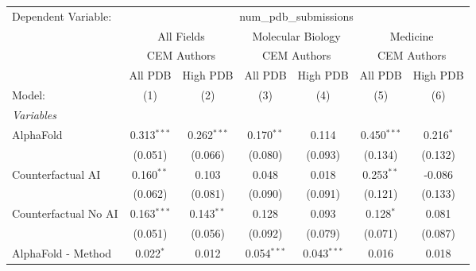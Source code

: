 \begingroup
\centering
\begin{tabular}{lcccccc}
   \tabularnewline \midrule \midrule
   Dependent Variable: & \multicolumn{6}{c}{num\_pdb\_submissions}\\
 & \multicolumn{2}{c}{All Fields} & \multicolumn{2}{c}{Molecular Biology} & \multicolumn{2}{c}{Medicine} \\
\cmidrule(lr){2-3} \cmidrule(lr){4-5} \cmidrule(lr){6-7}
 & \multicolumn{2}{c}{CEM Authors} & \multicolumn{2}{c}{CEM Authors} & \multicolumn{2}{c}{CEM Authors} \\
\cmidrule(lr){2-3} \cmidrule(lr){4-5} \cmidrule(lr){6-7}
 & \multicolumn{1}{c}{All PDB} & \multicolumn{1}{c}{High PDB} & \multicolumn{1}{c}{All PDB} & \multicolumn{1}{c}{High PDB} & \multicolumn{1}{c}{All PDB} & \multicolumn{1}{c}{High PDB} \\
\cmidrule(lr){2-2} \cmidrule(lr){3-3} \cmidrule(lr){4-4} \cmidrule(lr){5-5} \cmidrule(lr){6-6} \cmidrule(lr){7-7}
   Model:                                                     & (1)           & (2)           & (3)           & (4)            & (5)           & (6)\\  
   \midrule
   \emph{Variables}\\
   AlphaFold                                                  & 0.313$^{***}$ & 0.262$^{***}$ & 0.170$^{**}$  & 0.114          & 0.450$^{***}$ & 0.216$^{*}$\\   
                                                              & (0.051)       & (0.066)       & (0.080)       & (0.093)        & (0.134)       & (0.132)\\   
   Counterfactual AI                                          & 0.160$^{**}$  & 0.103         & 0.048         & 0.018          & 0.253$^{**}$  & -0.086\\   
                                                              & (0.062)       & (0.081)       & (0.090)       & (0.091)        & (0.121)       & (0.133)\\   
   Counterfactual No AI                                       & 0.163$^{***}$ & 0.143$^{**}$  & 0.128         & 0.093          & 0.128$^{*}$   & 0.081\\   
                                                              & (0.051)       & (0.056)       & (0.092)       & (0.079)        & (0.071)       & (0.087)\\   
   AlphaFold - Method                                         & 0.022$^{*}$   & 0.012         & 0.054$^{***}$ & 0.043$^{***}$  & 0.016         & 0.018\\   

\end{tabular}
